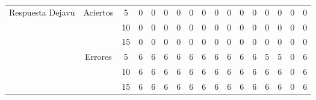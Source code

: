 \begin{sidewaystable}
\begin{tabular}{@{}ccc|rrrrrrrrrrrrrr@{}}
\multirow{6}{*}{Respuesta Dejavu}   & \multirow{3}{*}{Aciertos}  & 5                    & 0                      & 0                      & 0                      & 0                      & 0                      & 0                      & 0                      & 0                      & 0                      & 0                      & 0                      & 0                      & 0                      & 0                      \\
                                      &                            & 10                   & 0                      & 0                      & 0                      & 0                      & 0                      & 0                      & 0                      & 0                      & 0                      & 0                      & 0                      & 0                      & 0                      & 0                      \\
                                      &                            & 15                   & 0                      & 0                      & 0                      & 0                      & 0                      & 0                      & 0                      & 0                      & 0                      & 0                      & 0                      & 0                      & 0                      & 0                      \\ \cmidrule{2-17}
                                      & \multirow{3}{*}{Errores}   & 5                    & 6                      & 6                      & 6                      & 6                      & 6                      & 6                      & 6                      & 6                      & 6                      & 6                      & 5                      & 5                      & 0                      & 6                      \\
                                      &                            & 10                   & 6                      & 6                      & 6                      & 6                      & 6                      & 6                      & 6                      & 6                      & 6                      & 6                      & 6                      & 6                      & 0                      & 6                      \\
                                      &                            & 15                   & 6                      & 6                      & 6                      & 6                      & 6                      & 6                      & 6                      & 6                      & 6                      & 6                      & 6                      & 6                      & 0                      & 6                      \\

\end{tabular}
\end{sidewaystable}
